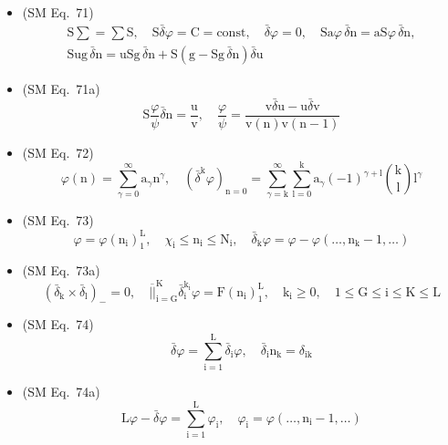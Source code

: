 \documentclass[12pt]{article}
\begin{document}
\begin{itemize}[label={},leftmargin=0pt]
    \item (SM Eq.\ 71) 
    \[
    \begin{gathered}
    \mathrm{S}\sum = \sum\mathrm{S}, \quad \mathrm{S}\bar{\delta}\varphi = \mathrm{C} = \mathrm{const}, \quad \bar{\delta}\varphi = 0, \quad \mathrm{S}\mathrm{a}\varphi\,\bar{\delta}\mathrm{n} = \mathrm{a}\mathrm{S}\varphi\,\bar{\delta}\mathrm{n}, \\
    \mathrm{S}\mathrm{ug}\,\bar{\delta}\mathrm{n} = \mathrm{u}\mathrm{S}\mathrm{g}\,\bar{\delta}\mathrm{n} + \mathrm{S}(\mathrm{g} - \mathrm{S}\mathrm{g}\,\bar{\delta}\mathrm{n})\bar{\delta}\mathrm{u}
    \end{gathered}
    \]

    \item (SM Eq.\ 71a) 
    \[
    \mathrm{S}\frac{\varphi}{\psi}\bar{\delta}\mathrm{n} = \frac{\mathrm{u}}{\mathrm{v}}, \quad \frac{\varphi}{\psi} = \frac{\mathrm{v}\bar{\delta}\mathrm{u} - \mathrm{u}\bar{\delta}\mathrm{v}}{\mathrm{v}(\mathrm{n})\mathrm{v}(\mathrm{n}-1)}
    \]

    \item (SM Eq.\ 72) 
    \[
    \varphi(\mathrm{n}) = \sum_{\gamma=0}^\infty \mathrm{a}_\gamma \mathrm{n}^\gamma, \quad (\bar{\delta}^\mathrm{k} \varphi)_{\mathrm{n}=0} = \sum_{\gamma=\mathrm{k}}^\infty \sum_{\mathrm{l}=0}^\mathrm{k} \mathrm{a}_\gamma (-1)^{\gamma+\mathrm{l}} \binom{\mathrm{k}}{\mathrm{l}} \mathrm{l}^\gamma
    \]

    \item (SM Eq.\ 73) 
    \[
    \varphi = \varphi(\mathrm{n_i})_1^\mathrm{L}, \quad \chi_\mathrm{i} \le \mathrm{n_i} \le \mathrm{N_i}, \quad \bar{\delta}_\mathrm{k} \varphi = \varphi - \varphi(\dots, \mathrm{n_k} - 1, \dots)
    \]

    \item (SM Eq.\ 73a) 
    \[
    (\bar{\delta}_\mathrm{k} \times \bar{\delta}_\mathrm{l})_- = 0, \quad \overline{||}_{\mathrm{i}=\mathrm{G}}^{\mathrm{K}} \bar{\delta}_\mathrm{i}^{\mathrm{k_i}} \varphi = \mathrm{F}(\mathrm{n_i})_1^\mathrm{L}, \quad \mathrm{k_i} \ge 0, \quad 1 \le \mathrm{G} \le \mathrm{i} \le \mathrm{K} \le \mathrm{L}
    \]

    \item (SM Eq.\ 74) 
    \[
    \bar{\delta}\varphi = \sum_{\mathrm{i}=1}^\mathrm{L} \bar{\delta}_\mathrm{i} \varphi, \quad \bar{\delta}_\mathrm{i} \mathrm{n_k} = \delta_{\mathrm{ik}}
    \]

    \item (SM Eq.\ 74a) 
    \[
    \mathrm{L}\varphi - \bar{\delta}\varphi = \sum_{\mathrm{i}=1}^\mathrm{L} \varphi_\mathrm{i}, \quad \varphi_\mathrm{i} = \varphi(\dots, \mathrm{n_i} - 1, \dots)
    \]


\end{itemize}
\end{document}
